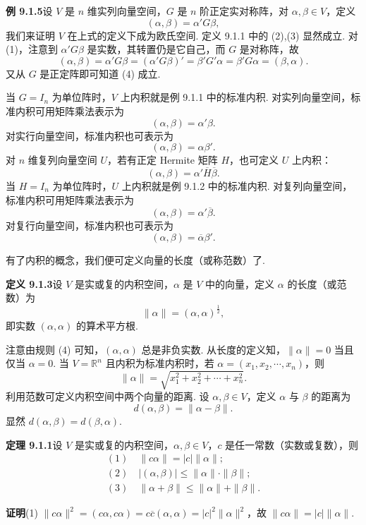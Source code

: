\documentclass[UTF8, 12pt, fontset=fandol, oneside]{ctexart}
\begin{document}
\noindent\textbf{例 9.1.5}\quad 设 $V$ 是 $n$ 维实列向量空间，$G$ 是 $n$ 阶正定实对称阵，对 $\alpha,\beta\in V$，定义
\[
  (\alpha,\beta)=\alpha'G\beta,
\]
我们来证明 $V$ 在上式的定义下成为欧氏空间. 定义 9.1.1 中的 (2),(3) 显然成立. 对 (1)，注意到 $\alpha'G\beta$ 是实数，其转置仍是它自己，而 $G$ 是对称阵，故
\[
  (\alpha,\beta)=\alpha'G\beta=(\alpha'G\beta)'=\beta'G'\alpha=\beta'G\alpha=(\beta,\alpha).
\]
又从 $G$ 是正定阵即可知道 (4) 成立.

当 $G=I_n$ 为单位阵时，$V$ 上内积就是例 9.1.1 中的标准内积. 对实列向量空间，标准内积可用矩阵乘法表示为
\[
  (\alpha,\beta)=\alpha'\beta.
\]
对实行向量空间，标准内积也可表示为
\[
  (\alpha,\beta)=\alpha\beta'.
\]
对 $n$ 维复列向量空间 $U$，若有正定 Hermite 矩阵 $H$，也可定义 $U$ 上内积：
\[
  (\alpha,\beta)=\alpha'\overline H\overline\beta.
\]
当 $H=I_n$ 为单位阵时，$U$ 上内积就是例 9.1.2 中的标准内积. 对复列向量空间，标准内积可用矩阵乘法表示为
\[
  (\alpha,\beta)=\alpha'\overline\beta.
\]
对复行向量空间，标准内积也可表示为
\[
  (\alpha,\beta)=\overline\alpha\beta'.
\]

有了内积的概念，我们便可定义向量的长度（或称范数）了.

\noindent\textbf{定义 9.1.3}\quad 设 $V$ 是实或复的内积空间，$\alpha$ 是 $V$ 中的向量，定义 $\alpha$ 的长度（或范数）为
\[
  \|\alpha\|=(\alpha,\alpha)^{\frac12},
\]
即实数 $(\alpha,\alpha)$ 的算术平方根.

注意由规则 (4) 可知，$(\alpha,\alpha)$ 总是非负实数. 从长度的定义知，$\|\alpha\|=0$ 当且仅当 $\alpha=0$. 当 $V=\mathbb R^n$ 且内积为标准内积时，若 $\alpha=(x_1,x_2,\cdots,x_n)$，则
\begin{equation}
  \|\alpha\|=\sqrt{x_1^2+x_2^2+\cdots+x_n^2}.
  \tag{9.1.2}
\end{equation}
利用范数可定义内积空间中两个向量的距离. 设 $\alpha,\beta\in V$，定义 $\alpha$ 与 $\beta$ 的距离为
\[
  d(\alpha,\beta)=\|\alpha-\beta\|.
\]
显然 $d(\alpha,\beta)=d(\beta,\alpha)$.

\noindent\textbf{定理 9.1.1}\quad 设 $V$ 是实或复的内积空间，$\alpha,\beta\in V$，$c$ 是任一常数（实数或复数），则
\[
\begin{gathered}
  (1)\quad \|c\alpha\|=|c|\|\alpha\|;\\
  (2)\quad |(\alpha,\beta)|\le \|\alpha\|\cdot\|\beta\|;\\
  (3)\quad \|\alpha+\beta\|\le \|\alpha\|+\|\beta\|.
\end{gathered}
\]

\noindent\textbf{证明}\quad (1) $\|c\alpha\|^2=(c\alpha,c\alpha)=c\overline c(\alpha,\alpha)=|c|^2\|\alpha\|^2$，故 $\|c\alpha\|=|c|\|\alpha\|$.
\end{document}
